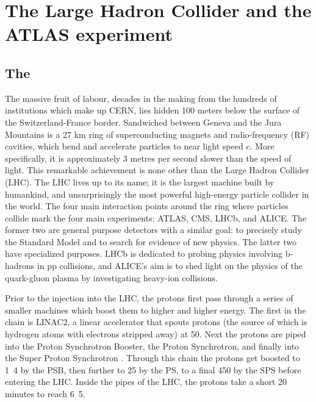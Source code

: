 \chapter{The Large Hadron Collider and the ATLAS experiment}
\label{chap:ATLASdetector}
\section{The \LHC}
\label{sec:LHC}

The massive fruit of labour, decades in the making from the hundreds of institutions which make up CERN, lies hidden 100 meters below the surface of the Switzerland-France border. Sandwiched between Geneva and the Jura Mountains is a 27 km ring of superconducting magnets and radio-frequency (RF) cavities, which bend and accelerate particles to near light speed $c$. More specifically, it is approximately 3 metres per second slower than the speed of light. This remarkable achievement is none other than the Large Hadron Collider (LHC). The LHC lives up to its name; it is the largest machine built by humankind, and unsurprisingly the most powerful high-energy particle collider in the world. The four main interaction points around the ring where particles collide mark the four main experiments: ATLAS, CMS, LHCb, and ALICE. The former two are general purpose detectors with a similar goal: to precisely study the Standard Model and to search for evidence of new physics. The latter two have specialized purposes. LHCb is dedicated to probing physics involving b-hadrons in pp collisions, and ALICE’s aim is to shed light on the physics of the quark-gluon plasma by investigating heavy-ion collisions. 

Prior to the injection into the LHC, the protons first pass through a series of smaller machines which boost them to higher and higher energy. The first in the chain is LINAC2, a linear accelerator that spouts protons (the source of which is hydrogen atoms with electrons stripped away) at \unit{50}{\MeV}. Next the protons are piped into the Proton Synchrotron Booster, the Proton Synchrotron, and finally into the Super Proton Synchrotron . Through this chain the protons get boosted to \unit{1.4}{\GeV} by the PSB, then further to \unit{25}{\GeV} by the PS, to a final \unit{450}{\GeV} by the SPS before entering the LHC. Inside the pipes of the LHC, the protons take a short 20 minutes to reach \unit{6.5}{\TeV}. 

